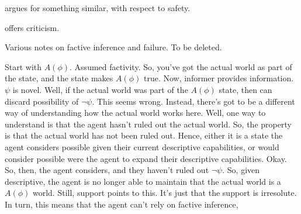 \documentclass[10pt]{article}
\newcommand{\hozline}[0]{%
  \noindent\hdashrule[0.5ex][c]{\textwidth}{.1pt}{}
}
\begin{document}
\begin{note}
  \cite{Smith:2009tl} argues for something similar, with respect to safety.


  \cite{Tucker:2012tv} offers criticism.
\end{note}


\hozline

{
  \color{red}
  Various notes on factive inference and failure.
  To be deleted.
}

\begin{note}[Example]
  Start with \(A(\phi)\).
  Assumed factivity.
  So, you've got the actual world as part of the state, and the state makes \(A(\phi)\) true.
  Now, informer provides information.
  \(\psi\) is novel.
  Well, if the actual world was part of the \(A(\phi)\) state, then can discard possibility of \(\lnot\psi\).
  This seems wrong.
  Instead, there's got to be a different way of understanding how the actual world works here.
  Well, one way to understand is that the agent hasn't ruled out the actual world.
  So, the property is that the actual world has not been ruled out.
  Hence, either it is a state the agent considers possible given their current descriptive capabilities, or would consider possible were the agent to expand their descriptive capabilities.
  Okay.
  So, then, the agent considers, and they haven't ruled out \(\lnot\psi\).
  So, given descriptive, the agent is no longer able to maintain that the actual world is a \(A(\phi)\) world.
  Still, support points to this.
  It's just that the support is irresolute.
  In turn, this means that the agent can't rely on factive inference, 
\end{note}
\end{document}
